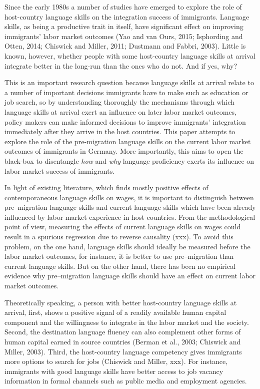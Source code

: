 \documentclass[12pt,a4paper]{article}
\begin{document}
Since the early 1980s a number of studies have emerged to explore the role of host-country language skills on the integration success of immigrants. Language skills, as being a productive trait in itself, have significant effect on improving immigrants' labor market outcomes (Yao and van Ours, 2015; Isphording and Otten, 2014; Chiswick and Miller, 2011; Dustmann and Fabbri, 2003). Little is known, however, whether people with some host-country language skills at arrival integrate better in the long-run than the ones who do not. And if yes, why? 

This is an important research question because language skills at arrival relate to a number of important decisions immigrants have to make such as education or job search, so by understanding thoroughly the mechanisms through which language skills at arrival exert an influence on later labor market outcomes, policy makers can make informed decisions to improve immigrants' integration immediately after they arrive in the host countries. This paper attempts to explore the role of the pre-migration language skills on the current labor market outcomes of immigrants in Germany. More importantly, this aims to open the black-box to disentangle \textit{how} and \textit{why} language proficiency exerts its influence on labor market success of immigrants.

In light of existing literature, which finds mostly positive effects of contemporaneous language skills on wages, it is important to distinguish between pre--migration language skills and current language skills which have been already influenced by labor market experience in host countries. From the methodological point of view, measuring the effects of current language skills on wages could result in a spurious regression due to reverse causality (xxx). To avoid this problem, on the one hand, language skills should ideally be measured before the labor market outcomes, for instance, it is better to use pre--migration than current language skills. But on the other hand, there has been no empirical evidence why pre--migration language skills should have an effect on current labor market outcomes.

Theoretically speaking, a person with better host-country language skills at arrival, first, shows a positive signal of a readily available human capital component and the willingness to integrate in the labor market and the society. Second, the destination language fluency can also complement other forms of human capital earned in source countries (Berman et al., 2003; Chiswick and Miller, 2003). Third, the host-country language competency gives immigrants more options to search for jobs (Chiswick and Miller, xxx). For instance, immigrants with good language skills have better access to job vacancy information in formal channels such as public media and employment agencies. 
\end{document}
